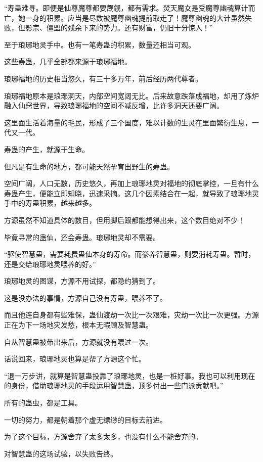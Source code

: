 \begin{this_body}
“寿蛊难寻。即便是仙尊魔尊都要觊觎，都有需求。焚天魔女是受魔尊幽魂算计而亡，她一身的积累。应当是尽数被魔尊幽魂提前取走了！魔尊幽魂的大计虽然失败，但影宗、僵盟的残余下来的势力。还有财富，仍旧十分惊人！”

至于琅琊地灵手中。也有一笔寿蛊的积累，数量还相当可观。

这些寿蛊，几乎全部都来源于琅琊福地。

琅琊福地的历史相当悠久，有三十多万年，前后经历两代尊者。

琅琊福地原本是琅琊洞天，内部空间宽阔无比。后来故意跌落成福地，却用了炼炉融入仙窍世界，导致琅琊福地的空间不减反增，比许多洞天还要广阔。

这里面生活着海量的毛民，形成了三个国度，难以计数的生灵在里面繁衍生息，一代又一代。

寿蛊的产生，就源于生命。

但凡是有生命的地方，都可能天然孕育出野生的寿蛊。

空间广阔，人口无数，历史悠久，再加上琅琊地灵对福地的彻底掌控，一旦有什么寿蛊产生，便能立即知晓，迅速采摘。这几个因素结合在一起，就导致了琅琊地灵手中的寿蛊积累，越来越多。

方源虽然不知道具体的数目，但用脚后跟都能想得出来，这个数目绝对不少！

毕竟寻常的蛊仙，还会寿蛊。琅琊地灵却不需要。

“驱使智慧蛊，需要耗费蛊仙本身的寿命。而豢养智慧蛊，则要消耗寿蛊。暂时，还是交给琅琊地灵喂养的好。”

琅琊地灵的图谋，方源不用试探，都隐约猜到了。

这是没办法的事情，方源自己没有寿蛊，喂养不了。

而且他连自身都有些难保，蛊仙渡劫一次比一次艰难，灾劫一次比一次更强。方源正在为下一场地灾发愁，根本无暇顾及智慧蛊。

自从智慧蛊被带出来后，方源就没有喂过一次。

话说回来，琅琊地灵也算是帮了方源这个忙。

“退一万步讲，就算是智慧蛊投靠了琅琊地灵，也是一桩好事。我也可以利用现在的身份，借助琅琊地灵的手段运用智慧蛊，顶多付出一些门派贡献吧。”

所有的蛊虫，都是工具。

一切的努力，都是朝着那个虚无缥缈的目标去前进。

为了这个目标，方源舍弃了太多太多，也没有什么不能舍弃的。

对智慧蛊的这场试验，以失败告终。


\end{this_body}
